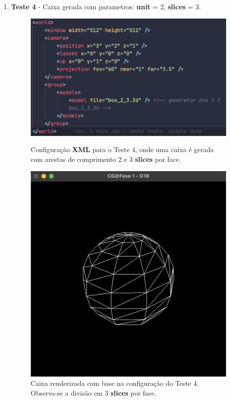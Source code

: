 \documentclass[12pt,a4paper]{report}%
\begin{document}
\begin{enumerate}
\newpage

\item \textbf{Teste 4} - Caixa gerada com parametros: \textbf{unit} = 2, \textbf{slices} = 3.
    \begin{figure}[H]
    \centering
    \begin{minipage}{0.49\linewidth}
        \centering
        \includegraphics[width=\linewidth]{images/xmlTeste4.png}
        \caption[Teste 4 - XML]{Configuração \textbf{XML} para o Teste 4, onde uma caixa é gerada com arestas de comprimento 2 e 3 \textbf{slices} por face.}
        \label{fig:xml-teste4}
    \end{minipage}
    \hfill
    \begin{minipage}{0.49\linewidth}
        \centering
        \includegraphics[width=\linewidth]{images/Teste4.png}
        \caption[Teste 4 - Desenho]{Caixa renderizada com base na configuração do Teste 4. Observa-se a divisão em 3 \textbf{slices} por face.}
        \label{fig:cena-teste4}
    \end{minipage}
\end{figure}


\end{enumerate}
\end{document}
